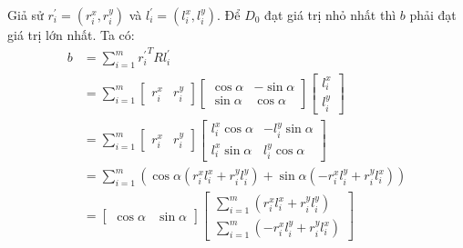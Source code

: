 \documentclass[../../main.tex]{subfiles}
\begin{document}
Giả sử  $r^{\prime}_i = (r^x_i, r^y_i)$ và $l^{\prime}_i = (l^x_i, l^y_i)$. Để $D_0$ đạt giá trị nhỏ nhất thì $b$ phải đạt giá trị lớn nhất.
Ta có:
\begin{equation}
    \begin{split}
    b &= \sum_{i = 1}^{m}{r^{\prime}_i}^T R l^{\prime}_i \\
    &= \sum_{i = 1}^{m} 
        \begin{bmatrix}
            r^x_i & r^y_i
        \end{bmatrix}
        \begin{bmatrix}
            \cos{\alpha} & -\sin{\alpha}\\
            \sin{\alpha} & \cos{\alpha}
        \end{bmatrix}
        \begin{bmatrix}
            l^x_i \\ l^y_i
        \end{bmatrix}\\
    &= \sum_{i = 1}^{m}
        \begin{bmatrix}
            r^x_i & r^y_i
        \end{bmatrix}
        \begin{bmatrix}
            l^x_i\cos{\alpha} & - l^y_i\sin{\alpha}\\
            l^x_i\sin{\alpha} & l^y_i\cos{\alpha}
        \end{bmatrix}\\
    &= \sum_{i = 1}^{m} (\cos{\alpha}(r^x_i l^x_i + r^y_i l^y_i) + \sin{\alpha}(-r^x_i l^y_i + r^y_i l^x_i)) \\
    &= 
        \begin{bmatrix}
            \cos{\alpha} & \sin{\alpha}
        \end{bmatrix}
        \begin{bmatrix}
            \sum_{i = 1}^{m} (r^x_i l^x_i + r^y_i l^y_i) \\
            \sum_{i = 1}^{m} (-r^x_i l^y_i + r^y_i l^x_i)
        \end{bmatrix}
    \end{split}
\end{equation}
\end{document}
